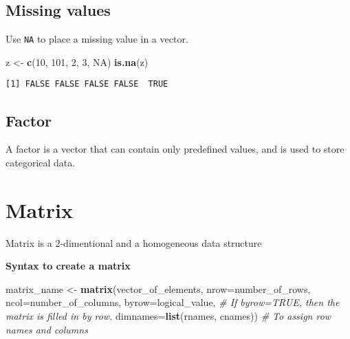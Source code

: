 \documentclass[
]{book}
\newenvironment{Shaded}{\begin{snugshade}}{\end{snugshade}}
\newcommand{\CommentTok}[1]{\textcolor[rgb]{0.56,0.35,0.01}{\textit{#1}}}
\newcommand{\DataTypeTok}[1]{\textcolor[rgb]{0.13,0.29,0.53}{#1}}
\newcommand{\DecValTok}[1]{\textcolor[rgb]{0.00,0.00,0.81}{#1}}
\newcommand{\KeywordTok}[1]{\textcolor[rgb]{0.13,0.29,0.53}{\textbf{#1}}}
\newcommand{\NormalTok}[1]{#1}
\newcommand{\OtherTok}[1]{\textcolor[rgb]{0.56,0.35,0.01}{#1}}
\newcommand{\StringTok}[1]{\textcolor[rgb]{0.31,0.60,0.02}{#1}}
\begin{document}
\hypertarget{missing-values}{%
\subsection{Missing values}\label{missing-values}}

Use \texttt{NA} to place a missing value in a vector.

\begin{Shaded}
\begin{Highlighting}[]
\NormalTok{z <-}\StringTok{ }\KeywordTok{c}\NormalTok{(}\DecValTok{10}\NormalTok{, }\DecValTok{101}\NormalTok{, }\DecValTok{2}\NormalTok{, }\DecValTok{3}\NormalTok{, }\OtherTok{NA}\NormalTok{)}
\KeywordTok{is.na}\NormalTok{(z)}
\end{Highlighting}
\end{Shaded}

\begin{verbatim}
[1] FALSE FALSE FALSE FALSE  TRUE
\end{verbatim}

\hypertarget{factor}{%
\subsection{Factor}\label{factor}}

A factor is a vector that can contain only predefined values, and is used to store categorical data.

\hypertarget{matrix}{%
\section{Matrix}\label{matrix}}

Matrix is a 2-dimentional and a homogeneous data structure

\textbf{Syntax to create a matrix}

\begin{Shaded}
\begin{Highlighting}[]
\NormalTok{matrix_name <-}\StringTok{ }\KeywordTok{matrix}\NormalTok{(vector_of_elements, }
                      \DataTypeTok{nrow=}\NormalTok{number_of_rows,}
                      \DataTypeTok{ncol=}\NormalTok{number_of_columns,}
                      \DataTypeTok{byrow=}\NormalTok{logical_value, }\CommentTok{# If byrow=TRUE, then the matrix is filled in by row.}
                      \DataTypeTok{dimnames=}\KeywordTok{list}\NormalTok{(rnames, cnames)) }\CommentTok{# To assign row names and columns}
\end{Highlighting}
\end{Shaded}
\end{document}
